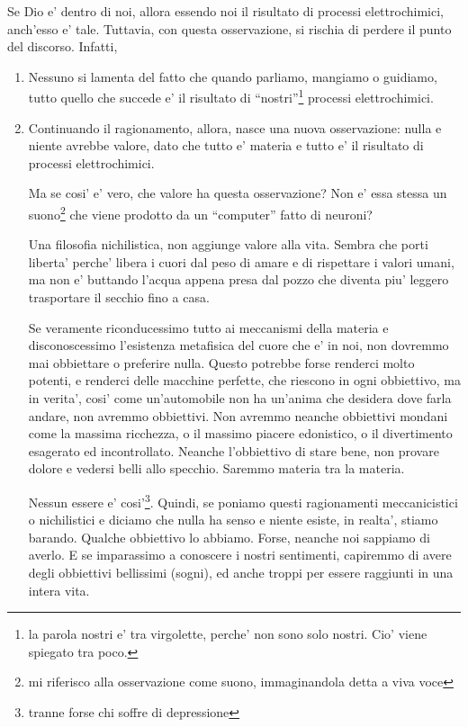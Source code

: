 Se Dio e' dentro di noi, allora essendo noi il risultato di processi elettrochimici, anch'esso e' tale. Tuttavia, con questa osservazione, si rischia di perdere il punto del discorso. Infatti, 
\begin{enumerate}
    \item Nessuno si lamenta del fatto che quando parliamo, mangiamo o guidiamo, tutto quello che succede e' il risultato di ``nostri''\footnote{la parola nostri e' tra virgolette, perche' non sono solo nostri. Cio' viene spiegato tra poco.} processi elettrochimici.
    \item Continuando il ragionamento, allora, nasce una nuova osservazione: nulla e niente avrebbe valore, dato che tutto e' materia e tutto e' il risultato di processi elettrochimici. 

        Ma se cosi' e' vero, che valore ha questa osservazione? Non e' essa stessa un suono\footnote{mi riferisco alla osservazione come suono, immaginandola detta a viva voce} che viene prodotto da un ``computer'' fatto di neuroni?

        Una filosofia nichilistica, non aggiunge valore alla vita. Sembra che porti liberta' perche' libera i cuori dal peso di amare e di rispettare i valori umani, ma non e' buttando l'acqua appena presa dal pozzo che diventa piu' leggero trasportare il secchio fino a casa.

        Se veramente riconducessimo tutto ai meccanismi della materia e disconoscessimo l'esistenza metafisica del cuore che e' in noi, non dovremmo mai obbiettare o preferire nulla. 
Questo potrebbe forse renderci molto potenti, e renderci delle macchine perfette, che riescono in ogni obbiettivo, ma in verita', cosi' come un'automobile non ha un'anima che desidera dove farla andare, non avremmo obbiettivi. Non avremmo neanche obbiettivi mondani come la massima ricchezza, o il massimo piacere edonistico, o il divertimento esagerato ed incontrollato. Neanche l'obbiettivo di stare bene, non provare dolore e vedersi belli allo specchio. Saremmo materia tra la materia.

        Nessun essere e' cosi'\footnote{tranne forse chi soffre di depressione}. Quindi, se poniamo questi ragionamenti meccanicistici o nichilistici e diciamo che nulla ha senso e niente esiste, in realta', stiamo barando. Qualche obbiettivo lo abbiamo. Forse, neanche noi sappiamo di averlo. E se imparassimo a conoscere i nostri sentimenti, capiremmo di avere degli obbiettivi bellissimi (sogni), ed anche troppi per essere raggiunti in una intera vita.
\end{enumerate}

